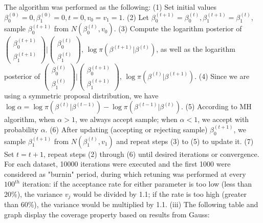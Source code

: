 \documentclass[12pt]{article}
\begin{document}
The algorithm was performed as the following: \newline
(1) Set initial values $\beta_0^{(0)} = 0, \beta_1^{(0)} = 0, t = 0, v_0 = v_1 = 1$. \newline
(2) Let $\beta_0^{(t+1)} = \beta_0^{(t)}, \beta_1^{(t+1)} = \beta_1^{(t)}$, sample $\beta_0^{(t+1)}$ from $N(\beta_0^{(t)}, v_0)$. \newline
(3) Compute the logarithm posterior of $\begin{pmatrix} \beta_0^{(t+1)} \\ \beta_1^{(t+1)} \end{pmatrix} | \begin{pmatrix} \beta_0^{(t)} \\ \beta_1^{(t)} \end{pmatrix}$, $\log \pi(\beta^{(t+1)}|\beta^{(t)})$, as well as the logarithm posterior of $\begin{pmatrix} \beta_0^{(t)} \\ \beta_1^{(t)} \end{pmatrix} | \begin{pmatrix} \beta_0^{(t+1)} \\ \beta_1^{(t+1)} \end{pmatrix}$, $\log \pi(\beta^{(t)}|\beta^{(t+1)})$. \newline
(4) Since we are using a symmetric proposal distribution, we have $\log\alpha = \log \pi(\beta^{(t)}|\beta^{(t-1)}) - \log \pi(\beta^{(t-1)}|\beta^{(t)})$.
(5) According to MH algorithm, when $\alpha > 1$, we always accept sample; when $\alpha < 1$, we accept with probability $\alpha$. \newline
(6) After updating (accepting or rejecting sample) $\beta_0^{(t+1)}$, we sample $\beta_1^{(t+1)}$ from $N(\beta_1^{(t)}, v_1)$ and repeat steps (3) to (5) to update it. \newline
(7) Set $t = t+1$, repeat steps (2) through (6) until desired iterations or convergence. \newline
For each dataset, 10000 iterations were executed and the first 1000 were considered as "burnin" period, during which retuning was performed at every $100^{th}$ iteration: if the acceptance rate for either parameter is too low (less than 20\%), the variance $v_j$ would be divided by 1.1; if the rate is too high (greater than 60\%), the variance would be multiplied by 1.1. \newline
(iii) The following table and graph display the coverage property based on results from Gauss:
\end{document}
